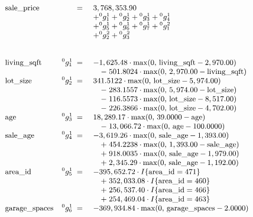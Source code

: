 \documentclass[
]{article}
\begin{document}
\[
 \small
\begin{array}{lrl}
  \text{sale\_price} & \;=\; & 3,768,353.90 \\
  & & + {}^{0}g^{1}_{1} + {}^{0}g^{1}_{2} + {}^{0}g^{1}_{3} + {}^{0}g^{1}_{4} \\
  & & + {}^{0}g^{1}_{5} + {}^{0}g^{1}_{6} + {}^{0}g^{1}_{7} + {}^{0}g^{2}_{1} \\
  & & + {}^{0}g^{2}_{2} + {}^{0}g^{2}_{3} \\
  & & \\ \\
  \text{living\_sqft} & {}^{0}g^{1}_{1} \;=\; & -1,625.48 \cdot \max(0,\, \text{living\_sqft} - 2,970.00) \\
  & & \quad - \; 501.8024 \cdot \max(0,\, 2,970.00 - \text{living\_sqft}) \\
  \text{lot\_size} & {}^{0}g^{1}_{2} \;=\; & 341.5122 \cdot \max(0,\, \text{lot\_size} - 5,974.00) \\
  & & \quad - \; 283.1557 \cdot \max(0,\, 5,974.00 - \text{lot\_size}) \\
  & & \quad - \; 116.5573 \cdot \max(0,\, \text{lot\_size} - 8,517.00) \\
  & & \quad - \; 226.3866 \cdot \max(0,\, \text{lot\_size} - 4,702.00) \\
  \text{age} & {}^{0}g^{1}_{3} \;=\; & 18,289.17 \cdot \max(0,\, 39.0000 - \text{age}) \\
  & & \quad - \; 13,066.72 \cdot \max(0,\, \text{age} - 100.0000) \\
  \text{sale\_age} & {}^{0}g^{1}_{4} \;=\; & -3,619.26 \cdot \max(0,\, \text{sale\_age} - 1,393.00) \\
  & & \quad + \; 454.2238 \cdot \max(0,\, 1,393.00 - \text{sale\_age}) \\
  & & \quad + \; 918.0035 \cdot \max(0,\, \text{sale\_age} - 1,979.00) \\
  & & \quad + \; 2,345.29 \cdot \max(0,\, \text{sale\_age} - 1,192.00) \\
  \text{area\_id} & {}^{0}g^{1}_{5} \;=\; & -395,652.72 \cdot I\{\text{area\_id} = \text{471}\} \\
  & & \quad + \; 352,033.08 \cdot I\{\text{area\_id} = \text{460}\} \\
  & & \quad + \; 256,537.40 \cdot I\{\text{area\_id} = \text{466}\} \\
  & & \quad + \; 254,469.04 \cdot I\{\text{area\_id} = \text{463}\} \\
  \text{garage\_spaces} & {}^{0}g^{1}_{6} \;=\; & -369,934.84 \cdot \max(0,\, \text{garage\_spaces} - 2.0000) \\

\end{array}\]
\end{document}
